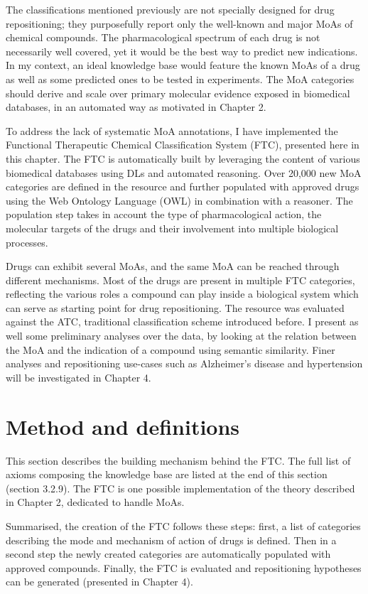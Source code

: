 The classifications mentioned previously are not specially designed for drug repositioning; they purposefully report only the well-known and major MoAs of chemical compounds. The pharmacological spectrum of each drug is not necessarily well covered, yet it would be the best way to predict new indications. In my context, an ideal knowledge base would feature the known MoAs of a drug as well as some predicted ones to be tested in experiments. The MoA categories should derive and scale over primary molecular evidence exposed in biomedical databases, in an automated way as motivated in Chapter 2.

To address the lack of systematic MoA annotations, I have implemented the Functional Therapeutic Chemical Classification System (FTC), presented here in this chapter. The FTC is automatically built by leveraging the content of various biomedical databases using DLs and automated reasoning. Over 20,000 new MoA categories are defined in the resource and further populated with approved drugs using the Web Ontology Language (OWL) in combination with a reasoner. The population step takes in account the type of pharmacological action, the molecular targets of the drugs and their involvement into multiple biological processes.

Drugs can exhibit several MoAs, and the same MoA can be reached through different mechanisms. Most of the drugs are present in multiple FTC categories, reflecting the various roles a compound can play inside a biological system which can serve as starting point for drug repositioning. The resource was evaluated against the ATC, traditional classification scheme introduced before. I present as well some preliminary analyses over the data, by looking at the relation between the MoA and the indication of a compound using semantic similarity. Finer analyses and repositioning use-cases such as Alzheimer's disease and hypertension will be investigated in Chapter 4.

\section{Method and definitions}
\label{method}

This section describes the building mechanism behind the FTC. The full list of axioms composing the knowledge base are listed at the end of this section (section 3.2.9). The FTC is one possible implementation of the theory described in Chapter 2, dedicated to handle MoAs.

Summarised, the creation of the FTC follows these steps: first, a list of categories describing the mode and mechanism of action of drugs is defined. Then in a second step the newly created categories are automatically populated with approved compounds. Finally, the FTC is evaluated and repositioning hypotheses can be generated (presented in Chapter 4).

